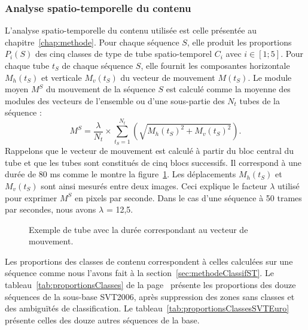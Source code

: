 \subsubsection{Analyse spatio-temporelle du contenu}
L'analyse spatio-temporelle du contenu utilisée est celle présentée au chapitre~\ref{chap:methode}. Pour chaque séquence $S$, elle produit les proportions $P_i(S)$ des cinq classes de type de tube spatio-temporel $C_i$ avec $i\in [\text{1};\text{5}]$. Pour chaque tube $t_S$ de chaque séquence $S$, elle fournit les composantes horizontale $M_h(t_S)$ et verticale $M_v(t_S)$ du vecteur de mouvement $M(t_S)$. Le module moyen $M^S$ du mouvement de la séquence $S$ est calculé comme la moyenne des modules des vecteurs de l'ensemble ou d'une sous-partie des $N_t$ tubes de la séquence :
\begin{equation}
M^S = \frac{\lambda}{N_t}\times\sum\limits_{t_S=1}^{N_t} \left(\sqrt{M_h(t_S)^2 + M_v(t_S)^2}\right). \label{eq:mvtTousTubes}
\end{equation}
%
Rappelons que le vecteur de mouvement est calculé à partir du bloc central du tube et que les tubes sont constitués de cinq blocs successifs. Il correspond à une durée de 80 ms comme le montre la figure~\ref{fig:dureeTube}. Les déplacements $M_h(t_S)$ et $M_v(t_S)$ sont ainsi mesurés entre deux images. Ceci explique le facteur $\lambda$ utilisé pour exprimer $M^S$ en pixels par seconde. Dans le cas d'une séquence à 50 trames par secondes, nous avons $\lambda$ = 12,5.

\begin{figure}[htbp]
	\centering
	\begin{tikzpicture}[scale=0.6]
		
	\end{tikzpicture}
	\caption{Exemple de tube avec la durée correspondant au vecteur de mouvement.}
  \label{fig:dureeTube}
\end{figure}

Les proportions des classes de contenu correspondent à celles calculées sur une séquence comme nous l'avons fait à la section~\ref{sec:methodeClassifST}. Le tableau~\ref{tab:proportionsClasses} de la page~\pageref{tab:proportionsClasses} présente les proportions des douze séquences de la sous-base SVT2006, après suppression des zones sans classes et des ambiguïtés de classification. Le tableau~\ref{tab:proportionsClassesSVTEuro} présente celles des douze autres séquences de la base.

